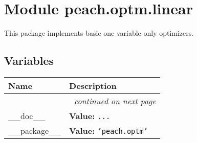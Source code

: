 %
%
%


\section{Module peach.optm.linear}

    \label{peach:optm:linear}

This package implements basic one variable only optimizers.


  \subsection{Variables}

    \vspace{-1cm}
\hspace{\varindent}\begin{longtable}{|p{\varnamewidth}|p{\vardescrwidth}|l}
\cline{1-2}
\cline{1-2} \centering \textbf{Name} & \centering \textbf{Description}& \\
\cline{1-2}
\endhead\cline{1-2}\multicolumn{3}{r}{\small\textit{continued on next page}}\\\endfoot\cline{1-2}
\endlastfoot\raggedright \_\-\_\-d\-o\-c\-\_\-\_\- & \raggedright \textbf{Value:} 
{\tt \texttt{...}}&\\
\cline{1-2}
\raggedright \_\-\_\-p\-a\-c\-k\-a\-g\-e\-\_\-\_\- & \raggedright \textbf{Value:} 
{\tt \texttt{'}\texttt{peach.optm}\texttt{'}}&\\
\cline{1-2}
\end{longtable}



